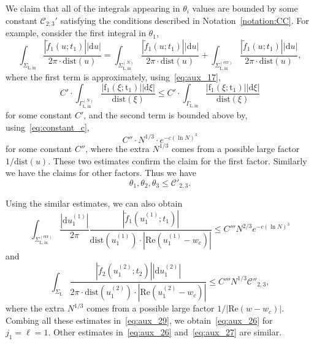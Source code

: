 \documentclass{article}
\numberwithin{equation}{section}
\newcommand{\CC}{\mathcal{C}}
\newcommand{\dtt}{\text{dist}}
\newcommand{\exe}{\mathrm{err}}
\newcommand{\inn}{\mathrm{in}}
\newcommand{\LL}{\mathrm{L}}
\begin{document}
We claim that all of the integrals appearing in $\theta_i$ values are bounded by  some constant $\CC_{2;3}'$ satisfying the conditions described in Notation~\ref{notation:CC}. For example, consider the first integral in $\theta_1$,
\begin{equation*}
	\int_{\Sigma_{\LL,\inn}} 	    
	\frac{|\tilde f_1(u;t_1)||\mathrm{d} u|}{2\pi\cdot \dtt(u)}  =\int_{\Sigma_{\LL,\inn}^{(N)}} 	    
	\frac{|\tilde f_1(u;t_1)||\mathrm{d} u|}{2\pi\cdot \dtt(u)}  +\int_{\Sigma_{\LL,\inn}^{(\exe)}} 	    
	\frac{|\tilde f_1(u;t_1)||\mathrm{d} u|}{2\pi\cdot \dtt(u)},
\end{equation*}
where the first term is approximately, using~\eqref{eq:aux_17},
\begin{equation*}
	C' \cdot \int_{\Gamma_{\LL,\inn}^{(N)}}\frac{|\mathrm{f}_1(\xi;\mathrm{t}_1)||\mathrm{d}\xi| }{\dtt(\xi)}\le C' \cdot \int_{\Gamma_{\LL,\inn}}\frac{|\mathrm{f}_1(\xi;\mathrm{t}_1)||\mathrm{d}\xi| }{\dtt(\xi)}
\end{equation*}
for some constant $C'$, 
and the second term is bounded above by, using~\eqref{eq:constant_c},
\begin{equation*}
	C''\cdot N^{1/3} \cdot e^{-c(\ln N)^3}
\end{equation*}
for some constant $C''$, where the extra $N^{1/3}$ comes from a possible large factor $1/\dtt(u)$. These two estimates confirm the claim for the first factor. Similarly we have the claims for other factors. Thus we have
\begin{equation*}
	\theta_1 , \theta_2, \theta_3 \le \CC'_{2,3}.
\end{equation*}

Using the similar estimates, we can also obtain
\begin{equation*}
	\int_{\Sigma_{\LL,\inn}^{(\exe)}} 	    
	\frac{|\mathrm{d}u^{(1)}_{1}|}{2\pi} \frac{|\tilde f_1(u_1^{(1)};t_1)|}{\dtt(u_1^{(1)})\cdot |\mathrm{Re}(u_1^{(1)}-w_c)|}\le C'''N^{2/3}e^{-c(\ln N)^3}
\end{equation*}
and
\begin{equation*}
	\int_{\Sigma_{\LL}} 	    
	\frac{|\tilde f_2(u^{(2)}_1;t_2)||\mathrm{d} u_1^{(2)}|}{2\pi\cdot \dtt(u_1^{(2)})\cdot |\mathrm{Re}(u_1^{(2)}-w_c)|} \le C'''N^{1/3}\CC''_{2,3},
\end{equation*}
where the extra $N^{1/3}$ comes from a possible large factor $1/|\mathrm{Re}(w-w_c)|$. Combing all these estimates in~\eqref{eq:aux_29}, we obtain~\eqref{eq:aux_26} for $j_1=\ell=1$. Other estimates in~\eqref{eq:aux_26} and~\eqref{eq:aux_27} are similar.
\end{document}
